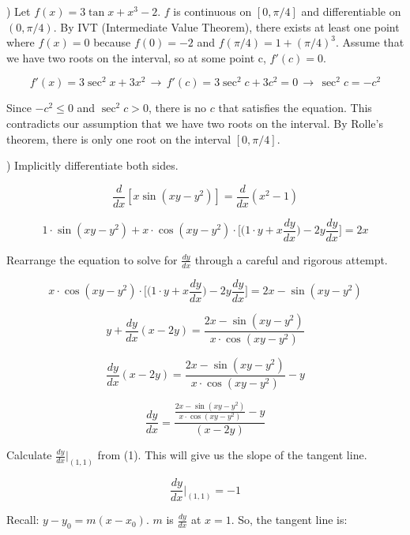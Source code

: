 \documentclass{article}
\begin{document}
\hfill

) Let $f(x) = 3\tan x + x^3 -2$. $f$ is continuous on $[0, \pi/4]$ and differentiable on $(0, \pi/4)$. By IVT (Intermediate Value Theorem), there exists at least one point where $f(x) = 0$ because $f(0) = -2$ and $f(\pi/4) = 1 + (\pi/4)^3$. Assume that we have two roots on the interval, so at some point c, $f'(c) = 0$.

\[f'(x) = 3\sec^2x + 3x^2\,\rightarrow\, f'(c) = 3\sec^2c + 3c^2 = 0\,\rightarrow\,\sec^2c =-c^2 \]

\hfill

\noindent Since $-c^2 \leq 0$ and $\sec ^2c > 0$, there is no $c$ that satisfies the equation. This contradicts our assumption that we have two roots on the interval. By Rolle's theorem, there is only one root on the interval $[0, \pi/4]$.

\hfill

) Implicitly differentiate both sides.

\[\frac{d}{dx}[x \sin(xy-y^2)] = \frac{d}{dx}(x^2-1) \]

\[1\cdot \sin(xy-y^2) + x\cdot\cos(xy-y^2) \cdot \Big[\Big(1\cdot y + x\frac{dy}{dx} \Big) -2y\frac{dy}{dx}\Big]= 2x\]

\hfill

\noindent Rearrange the equation to solve for $\frac{dy}{dx}$ through a careful and rigorous attempt.

\[ x\cdot\cos(xy-y^2) \cdot \Big[\Big(1\cdot y + x\frac{dy}{dx} \Big) -2y\frac{dy}{dx}\Big]= 2x - \sin(xy-y^2)\]

\[ y + \frac{dy}{dx}(x-2y)= \frac{2x - \sin(xy-y^2)}{x\cdot\cos(xy-y^2)}\]

\[ \frac{dy}{dx}(x-2y)= \frac{2x - \sin(xy-y^2)}{x\cdot\cos(xy-y^2)} - y\]

\hfill

\begin{equation} \frac{dy}{dx} = \frac{\frac{2x - \sin(xy-y^2)}{x\cdot\cos(xy-y^2)} - y}{(x-2y)}\end{equation}

\hfill

\noindent Calculate $\displaystyle \frac{dy}{dx}\Bigg|_{(1,1)}$ from (1). This will give us the slope of the tangent line.

\[\frac{dy}{dx}\Bigg|_{(1,1)} = -1\]

\hfill

\noindent Recall: $y-y_0 = m(x-x_0)$. $m$ is $\displaystyle \frac{dy}{dx}$ at $x=1$. So, the tangent line is:
\end{document}
